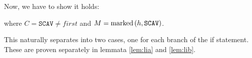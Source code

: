 \begin{lemma}
  Now, we have to show it holds:

  \begin{prooftree}
  \end{prooftree}

  where $C = \mathtt{SCAV} \neq first$ and $M =
  \marked{h}{\mathtt{SCAV}}$.

  This naturally separates into two cases, one for each branch of the
  if statement. These are proven separately in lemmata \ref{lem:lia}
  and \ref{lem:lib}.
  \label{lem:li}
\end{lemma}

